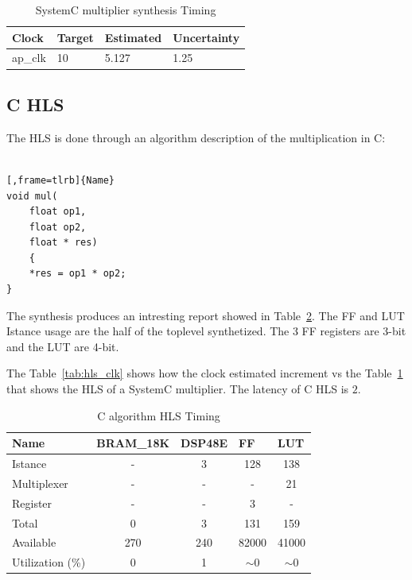 \documentclass[]{IEEEtran}
\begin{document}
	\begin{table}[]
		\centering
		\begin{tabular}{@{}llll@{}}
			\toprule
			Clock & Target & Estimated & Uncertainty  \\ \midrule
			ap\_clk      & 10       & 5.127     & 1.25      \\ \bottomrule
		\end{tabular}
		\caption{SystemC multiplier synthesis Timing}
		\label{tab:systemc_sintesi_time}
	\end{table}

\subsection{C HLS}
	The HLS is done through an algorithm description of the multiplication in C:
\\
\\
\noindent
\begin{minipage}{.45\textwidth}
	\begin{lstlisting}[,frame=tlrb]{Name}
void mul(
	float op1, 
	float op2, 
	float * res) 
	{
    *res = op1 * op2;
}
	\end{lstlisting}
\end{minipage}\hfill
The synthesis produces an intresting report showed in Table~\ref{tab:hls_timing}. The FF and LUT Istance usage are the half of the toplevel synthetized.
The 3 FF registers are 3-bit and the LUT are 4-bit.

The Table~\ref{tab:hls_clk} shows how the clock estimated increment vs the Table~\ref{tab:systemc_sintesi_time} that shows the HLS of a SystemC multiplier.
The latency of C HLS is $2$.
		
\begin{table}[]
	\centering
	\begin{tabular}{@{}lcccc@{}}
		\toprule
		Name        & \multicolumn{1}{l}{BRAM\_18K} & \multicolumn{1}{l}{DSP48E} & \multicolumn{1}{l}{FF} & \multicolumn{1}{l}{LUT} \\ \midrule
		Istance     & -                             & 3                          & 128                    & 138                     \\
		Multiplexer & -                             & -                          & -                      & 21                      \\
		Register    & -                             & -                          & 3                      & -                       \\
		Total       & 0                             & 3                          & 131                    & 159                     \\
		Available   & 270                           & 240                        & 82000                  & 41000                   \\
		Utilization (\%) & 0                           & 1                          & $\sim$0                & $\sim$0                 \\ \bottomrule
	\end{tabular}
	\caption{C algorithm HLS Timing}
\label{tab:hls_timing}
\end{table}
\end{document}
